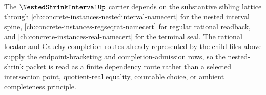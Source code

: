 The $\NestedShrinkIntervalUp$ carrier depends on the substantive sibling lattice through \autoref{ch:concrete-instances-nestedinterval-namecert} for the nested interval spine, \autoref{ch:concrete-instances-regseqrat-namecert} for regular rational readback, and \autoref{ch:concrete-instances-real-namecert} for the terminal seal. The rational locator and Cauchy-completion routes already represented by the child files above supply the endpoint-bracketing and completion-admission rows, so the nested-shrink packet is read as a finite dependency route rather than a selected intersection point, quotient-real equality, countable choice, or ambient completeness principle.

